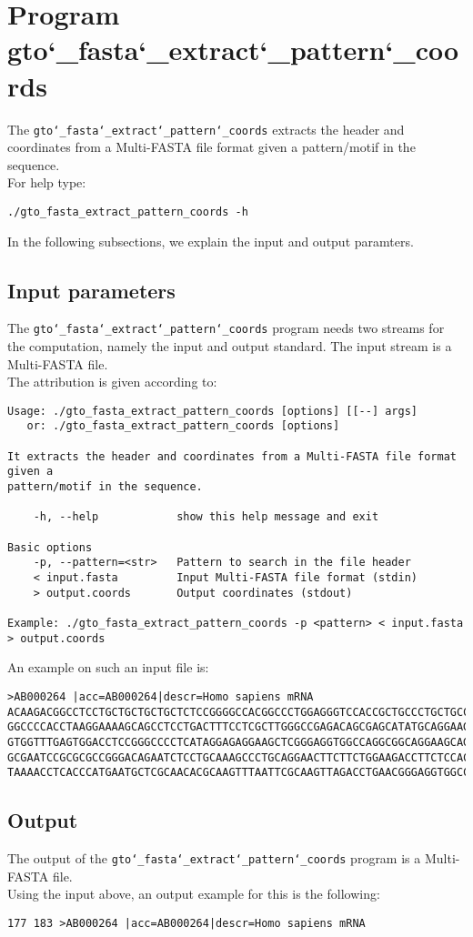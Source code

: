 \section{Program gto\char`_fasta\char`_extract\char`_pattern\char`_coords}
The \texttt{gto\char`_fasta\char`_extract\char`_pattern\char`_coords} extracts the header and coordinates from a Multi-FASTA file format given a pattern/motif in the sequence. \\
For help type:
\begin{lstlisting}
./gto_fasta_extract_pattern_coords -h
\end{lstlisting}
In the following subsections, we explain the input and output paramters.

\subsection*{Input parameters}

The \texttt{gto\char`_fasta\char`_extract\char`_pattern\char`_coords} program needs two streams for the computation, namely the input and output standard. The input stream is a Multi-FASTA  file.\\
The attribution is given according to:
\begin{lstlisting}
Usage: ./gto_fasta_extract_pattern_coords [options] [[--] args]
   or: ./gto_fasta_extract_pattern_coords [options]

It extracts the header and coordinates from a Multi-FASTA file format given a 
pattern/motif in the sequence.

    -h, --help            show this help message and exit

Basic options
    -p, --pattern=<str>   Pattern to search in the file header
    < input.fasta         Input Multi-FASTA file format (stdin)
    > output.coords       Output coordinates (stdout)

Example: ./gto_fasta_extract_pattern_coords -p <pattern> < input.fasta > output.coords
\end{lstlisting}
An example on such an input file is:
\begin{lstlisting}
>AB000264 |acc=AB000264|descr=Homo sapiens mRNA 
ACAAGACGGCCTCCTGCTGCTGCTGCTCTCCGGGGCCACGGCCCTGGAGGGTCCACCGCTGCCCTGCTGCCATTGTCCCC
GGCCCCACCTAAGGAAAAGCAGCCTCCTGACTTTCCTCGCTTGGGCCGAGACAGCGAGCATATGCAGGAAGCGGCAGGAA
GTGGTTTGAGTGGACCTCCGGGCCCCTCATAGGAGAGGAAGCTCGGGAGGTGGCCAGGCGGCAGGAAGCAGGCCAGTGCC
GCGAATCCGCGCGCCGGGACAGAATCTCCTGCAAAGCCCTGCAGGAACTTCTTCTGGAAGACCTTCTCCACCCCCCCAGC
TAAAACCTCACCCATGAATGCTCGCAACACGCAAGTTTAATTCGCAAGTTAGACCTGAACGGGAGGTGGCCACGCAAGTT
\end{lstlisting}

\subsection*{Output}
The output of the \texttt{gto\char`_fasta\char`_extract\char`_pattern\char`_coords} program is a Multi-FASTA  file.\\
Using the input above, an output example for this is the following:
\begin{lstlisting}
177	183	>AB000264 |acc=AB000264|descr=Homo sapiens mRNA 
\end{lstlisting}
